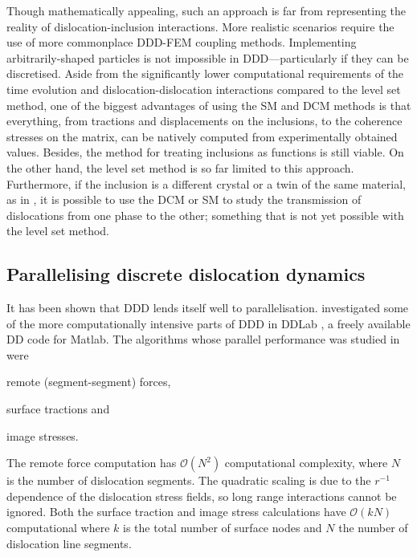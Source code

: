 Though mathematically appealing, such an approach is far from representing the reality of dislocation-inclusion interactions. More realistic scenarios require the use of more commonplace DDD-FEM coupling methods. Implementing arbitrarily-shaped particles is not impossible in DDD---particularly if they can be discretised. Aside from the significantly lower computational requirements of the time evolution and dislocation-dislocation interactions compared to the level set method, one of the biggest advantages of using the SM and DCM methods is that everything, from tractions and displacements on the inclusions, to the coherence stresses on the matrix, can be natively computed from experimentally obtained values. Besides, the method for treating inclusions as functions is still viable. On the other hand, the level set method is so far limited to this approach. Furthermore, if the inclusion is a different crystal or a twin of the same material, as in \cite{twinning}, it is possible to use the DCM or SM to study the transmission of dislocations from one phase to the other; something that is not yet possible with the level set method.

\subsection{Parallelising discrete dislocation dynamics}
\label{ss:parallel_ddd}
It has been shown that DDD lends itself well to parallelisation.  investigated some of the more computationally intensive parts of DDD in DDLab \cite{ddlab}, a freely available DD code for Matlab. The algorithms whose parallel performance was studied in \cite{gpu_ddd} were
\begin{inparaenum}
    \item remote (segment-segment) forces,
    \item surface tractions and
    \item image stresses.
\end{inparaenum}
The remote force computation has $ \mathcal{O}(N^{2}) $ computational complexity, where $ N $ is the number of dislocation segments. The quadratic scaling is due to the $ r^{-1} $ dependence of the dislocation stress fields, so long range interactions cannot be ignored. Both the surface traction and image stress calculations have $ \mathcal{O}(k N) $ computational where $ k $ is the total number of surface nodes and $ N $ the number of dislocation line segments.

